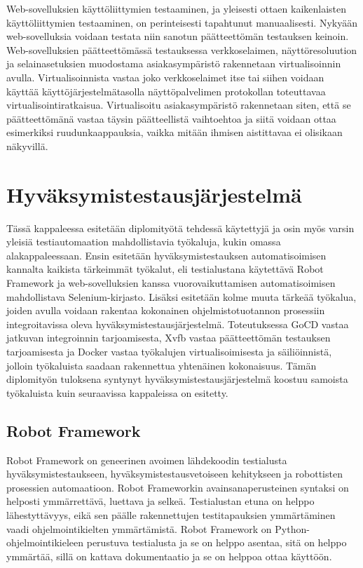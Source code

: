   Web-sovelluksien käyttöliittymien testaaminen, ja yleisesti ottaen kaikenlaisten käyttöliittymien testaaminen, on perinteisesti tapahtunut manuaalisesti.
  Nykyään web-sovelluksia voidaan testata niin sanotun päätteettömän testauksen keinoin.
  Web-sovelluksien päätteettömässä testauksessa verkkoselaimen, näyttöresoluution ja selainasetuksien muodostama asiakasympäristö rakennetaan virtualisoinnin avulla.
  Virtualisoinnista vastaa joko verkkoselaimet itse tai siihen voidaan käyttää käyttöjärjestelmätasolla näyttöpalvelimen protokollan toteuttavaa virtualisointiratkaisua.
  Virtualisoitu asiakasympäristö rakennetaan siten, että se päätteettömänä vastaa täysin päätteellistä vaihtoehtoa ja siitä voidaan ottaa esimerkiksi ruudunkaappauksia, vaikka mitään ihmisen aistittavaa ei olisikaan näkyvillä.

\section{Hyväksymistestausjärjestelmä} \label{ch:08_hyvaksymistestausjarjestelma}

  Tässä kappaleessa esitetään diplomityötä tehdessä käytettyjä ja osin myös varsin yleisiä testiautomaation mahdollistavia työkaluja, kukin omassa alakappaleessaan.
  Ensin esitetään hyväksymistestauksen automatisoimisen kannalta kaikista tärkeimmät työkalut, eli testialustana käytettävä Robot Framework ja web-sovelluksien kanssa vuorovaikuttamisen automatisoimisen mahdollistava Selenium-kirjasto.
  Lisäksi esitetään kolme muuta tärkeää työkalua, joiden avulla voidaan rakentaa kokonainen ohjelmistotuotannon prosessiin integroitavissa oleva hyväksymistestausjärjestelmä.
  Toteutuksessa GoCD vastaa jatkuvan integroinnin tarjoamisesta, Xvfb vastaa päätteettömän testauksen tarjoamisesta ja Docker vastaa työkalujen virtualisoimisesta ja säiliöinnistä, jolloin työkaluista saadaan rakennettua yhtenäinen kokonaisuus.
  Tämän diplomityön tuloksena syntynyt hyväksymistestausjärjestelmä koostuu samoista työkaluista kuin seuraavissa kappaleissa on esitetty.

  \subsection{Robot Framework} \label{ch:08_robot_framework}

    Robot Framework on geneerinen avoimen lähdekoodin testialusta hyväksymistestaukseen, hyväksymistestausvetoiseen kehitykseen ja robottisten prosessien automaatioon.
    Robot Frameworkin avainsanaperusteinen syntaksi on helposti ymmärrettävä, luettava ja selkeä.
    Testialustan etuna on helppo lähestyttävyys, eikä sen päälle rakennettujen testitapauksien ymmärtäminen vaadi ohjelmointikielten ymmärtämistä.
    Robot Framework on Python-ohjelmointikieleen perustuva testialusta ja se on helppo asentaa, sitä on helppo ymmärtää, sillä on kattava dokumentaatio ja se on helppoa ottaa käyttöön. \cite{robot_framework_user_guide}

